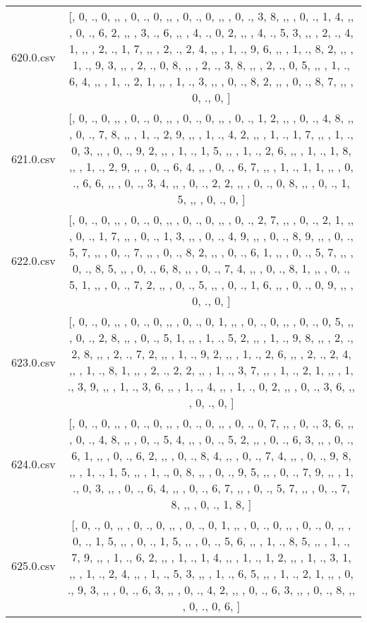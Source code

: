\begin{table}[ht]
\begin{tabular}{@{}c c@{}}
	620.0.csv & [, 0, ., 0, ,,  , 0, ., 0, ,,  , 0, ., 0, ,,  , 0, ., 3, 8, ,,  , 0, ., 1, 4, ,,  , 0, ., 6, 2, ,,  , 3, ., 6, ,,  , 4, ., 0, 2, ,,  , 4, ., 5, 3, ,,  , 2, ., 4, 1, ,,  , 2, ., 1, 7, ,,  , 2, ., 2, 4, ,,  , 1, ., 9, 6, ,,  , 1, ., 8, 2, ,,  , 1, ., 9, 3, ,,  , 2, ., 0, 8, ,,  , 2, ., 3, 8, ,,  , 2, ., 0, 5, ,,  , 1, ., 6, 4, ,,  , 1, ., 2, 1, ,,  , 1, ., 3, ,,  , 0, ., 8, 2, ,,  , 0, ., 8, 7, ,,  , 0, ., 0, ]\\ 
	621.0.csv & [, 0, ., 0, ,,  , 0, ., 0, ,,  , 0, ., 0, ,,  , 0, ., 1, 2, ,,  , 0, ., 4, 8, ,,  , 0, ., 7, 8, ,,  , 1, ., 2, 9, ,,  , 1, ., 4, 2, ,,  , 1, ., 1, 7, ,,  , 1, ., 0, 3, ,,  , 0, ., 9, 2, ,,  , 1, ., 1, 5, ,,  , 1, ., 2, 6, ,,  , 1, ., 1, 8, ,,  , 1, ., 2, 9, ,,  , 0, ., 6, 4, ,,  , 0, ., 6, 7, ,,  , 1, ., 1, 1, ,,  , 0, ., 6, 6, ,,  , 0, ., 3, 4, ,,  , 0, ., 2, 2, ,,  , 0, ., 0, 8, ,,  , 0, ., 1, 5, ,,  , 0, ., 0, ]\\ 
	622.0.csv & [, 0, ., 0, ,,  , 0, ., 0, ,,  , 0, ., 0, ,,  , 0, ., 2, 7, ,,  , 0, ., 2, 1, ,,  , 0, ., 1, 7, ,,  , 0, ., 1, 3, ,,  , 0, ., 4, 9, ,,  , 0, ., 8, 9, ,,  , 0, ., 5, 7, ,,  , 0, ., 7, ,,  , 0, ., 8, 2, ,,  , 0, ., 6, 1, ,,  , 0, ., 5, 7, ,,  , 0, ., 8, 5, ,,  , 0, ., 6, 8, ,,  , 0, ., 7, 4, ,,  , 0, ., 8, 1, ,,  , 0, ., 5, 1, ,,  , 0, ., 7, 2, ,,  , 0, ., 5, ,,  , 0, ., 1, 6, ,,  , 0, ., 0, 9, ,,  , 0, ., 0, ]\\ 
	623.0.csv & [, 0, ., 0, ,,  , 0, ., 0, ,,  , 0, ., 0, 1, ,,  , 0, ., 0, ,,  , 0, ., 0, 5, ,,  , 0, ., 2, 8, ,,  , 0, ., 5, 1, ,,  , 1, ., 5, 2, ,,  , 1, ., 9, 8, ,,  , 2, ., 2, 8, ,,  , 2, ., 7, 2, ,,  , 1, ., 9, 2, ,,  , 1, ., 2, 6, ,,  , 2, ., 2, 4, ,,  , 1, ., 8, 1, ,,  , 2, ., 2, 2, ,,  , 1, ., 3, 7, ,,  , 1, ., 2, 1, ,,  , 1, ., 3, 9, ,,  , 1, ., 3, 6, ,,  , 1, ., 4, ,,  , 1, ., 0, 2, ,,  , 0, ., 3, 6, ,,  , 0, ., 0, ]\\ 
	624.0.csv & [, 0, ., 0, ,,  , 0, ., 0, ,,  , 0, ., 0, ,,  , 0, ., 0, 7, ,,  , 0, ., 3, 6, ,,  , 0, ., 4, 8, ,,  , 0, ., 5, 4, ,,  , 0, ., 5, 2, ,,  , 0, ., 6, 3, ,,  , 0, ., 6, 1, ,,  , 0, ., 6, 2, ,,  , 0, ., 8, 4, ,,  , 0, ., 7, 4, ,,  , 0, ., 9, 8, ,,  , 1, ., 1, 5, ,,  , 1, ., 0, 8, ,,  , 0, ., 9, 5, ,,  , 0, ., 7, 9, ,,  , 1, ., 0, 3, ,,  , 0, ., 6, 4, ,,  , 0, ., 6, 7, ,,  , 0, ., 5, 7, ,,  , 0, ., 7, 8, ,,  , 0, ., 1, 8, ]\\ 
	625.0.csv & [, 0, ., 0, ,,  , 0, ., 0, ,,  , 0, ., 0, 1, ,,  , 0, ., 0, ,,  , 0, ., 0, ,,  , 0, ., 1, 5, ,,  , 0, ., 1, 5, ,,  , 0, ., 5, 6, ,,  , 1, ., 8, 5, ,,  , 1, ., 7, 9, ,,  , 1, ., 6, 2, ,,  , 1, ., 1, 4, ,,  , 1, ., 1, 2, ,,  , 1, ., 3, 1, ,,  , 1, ., 2, 4, ,,  , 1, ., 5, 3, ,,  , 1, ., 6, 5, ,,  , 1, ., 2, 1, ,,  , 0, ., 9, 3, ,,  , 0, ., 6, 3, ,,  , 0, ., 4, 2, ,,  , 0, ., 6, 3, ,,  , 0, ., 8, ,,  , 0, ., 0, 6, ]\\ 

\end{tabular}
\end{table}
